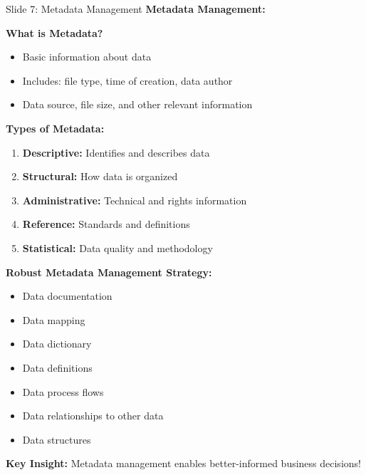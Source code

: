 \documentclass[8pt]{beamer}
\begin{document}
	\begin{frame}{Slide 7: Metadata Management}
		\fontsize{6.5}{7.5}\selectfont
		\textbf{Metadata Management:}
		
		\vspace{0.1cm}
		\textbf{What is Metadata?}
		\begin{itemize}
			\item Basic information about data
			\item Includes: file type, time of creation, data author
			\item Data source, file size, and other relevant information
		\end{itemize}
		
		\vspace{0.1cm}
		\textbf{Types of Metadata:}
		\begin{enumerate}
			\item \textbf{Descriptive:} Identifies and describes data
			\item \textbf{Structural:} How data is organized
			\item \textbf{Administrative:} Technical and rights information
			\item \textbf{Reference:} Standards and definitions
			\item \textbf{Statistical:} Data quality and methodology
		\end{enumerate}
		
		\vspace{0.1cm}
		\textbf{Robust Metadata Management Strategy:}
		\begin{itemize}
			\item Data documentation
			\item Data mapping
			\item Data dictionary
			\item Data definitions
			\item Data process flows
			\item Data relationships to other data
			\item Data structures
		\end{itemize}
		
		\textcolor{myblue}{\textbf{Key Insight:}} Metadata management enables \textcolor{myblue}{better-informed business decisions}!
	\end{frame}
	
\end{document}
